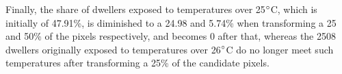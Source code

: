 \documentclass[10pt,letterpaper]{article}
\begin{document}
Finally, the share of dwellers exposed to temperatures over 25$\degree$C, which is initially of 47.91\%, is diminished to a 24.98 and 5.74\% when transforming a 25 and 50\% of the pixels respectively, and becomes 0 after that, whereas the 2508 dwellers originally exposed to temperatures over 26$\degree$C do no longer meet such temperatures after transforming a 25\% of the candidate pixels.
\end{document}
